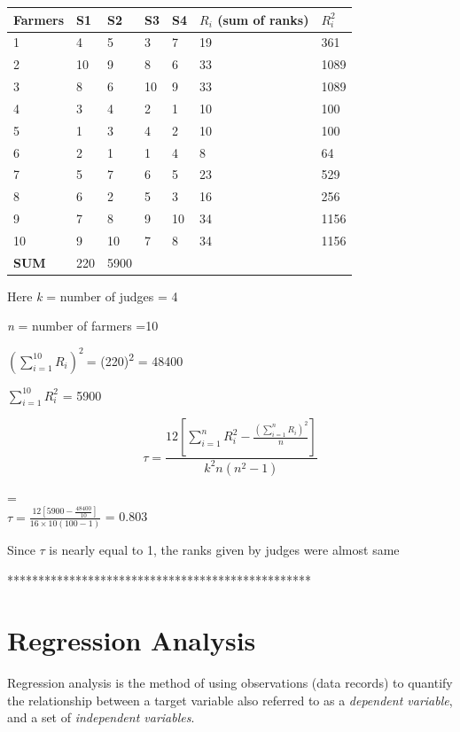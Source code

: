 \documentclass[
]{book}
\begin{document}
\begin{longtable}[]{@{}lllllll@{}}
\toprule
Farmers & S1 & S2 & S3 & S4 & \(R_{i}\) (sum of ranks) & \(R_{i}^{2}\) \\
\midrule
\endhead
1 & 4 & 5 & 3 & 7 & 19 & 361 \\
2 & 10 & 9 & 8 & 6 & 33 & 1089 \\
3 & 8 & 6 & 10 & 9 & 33 & 1089 \\
4 & 3 & 4 & 2 & 1 & 10 & 100 \\
5 & 1 & 3 & 4 & 2 & 10 & 100 \\
6 & 2 & 1 & 1 & 4 & 8 & 64 \\
7 & 5 & 7 & 6 & 5 & 23 & 529 \\
8 & 6 & 2 & 5 & 3 & 16 & 256 \\
9 & 7 & 8 & 9 & 10 & 34 & 1156 \\
10 & 9 & 10 & 7 & 8 & 34 & 1156 \\
\textbf{SUM} & 220 & 5900 & & & & \\
\bottomrule
\end{longtable}

Here \emph{k} = number of judges = 4

\emph{n} = number of farmers =10

\(\left( \sum_{i = 1}^{10}R_{i} \right)^{2}\ \)= (220)\textsuperscript{2} = 48400

\(\sum_{i = 1}^{10}R_{i}^{2}\) = 5900

\[\tau = \frac{12\left\lbrack \sum_{i = 1}^{n}{R_{i}^{2} - \frac{\left( \sum_{i = 1}^{n}R_{i} \right)^{2}}{n}} \right\rbrack}{k^{2}n\left( n^{2} - 1 \right)}\]

=\\
\(\tau = \frac{12\left\lbrack 5900 - \frac{48400}{10} \right\rbrack}{16 \times 10\left( 100 - 1 \right)}\)
= 0.803

Since \(\tau\) is nearly equal to 1, the ranks given by judges were almost
same

*************************************************

\hypertarget{regression-analysis}{%
\chapter{Regression Analysis}\label{regression-analysis}}

Regression analysis is the method of using observations (data records)
to quantify the relationship between a target variable also referred to
as a \emph{dependent variable}, and a set of \emph{independent variables}.
\end{document}
